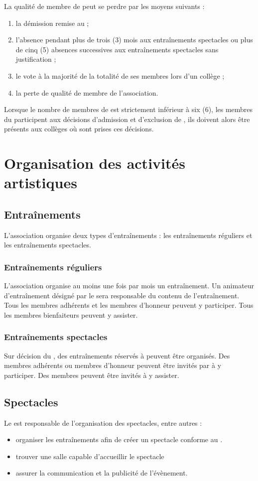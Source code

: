 \documentclass[a4paper,french,10pt]{article}
\newcommand{\article}[1]{\subsection{#1}\addtocounter{article}{1}}
\newcounter{article}
\begin{document}
La qualité de membre de \troupe{} peut se perdre par les moyens suivants :

\begin{enumerate}
	\item la démission remise au \DA{} ;
	\item l'absence pendant plus de trois  (3) mois aux entraînements spectacles ou plus de cinq (5) absences successives aux entraînements spectacles sans justification ;
	\item le vote à la majorité de la totalité de ses membres lors d'un collège ;
	\item la perte de qualité de membre de l'association.

\end{enumerate}

Lorsque le nombre de membres de \troupe{} est strictement inférieur à six (6), les membres du \bureau{} participent aux décisions d'admission et d'exclusion de \troupe{}, ils doivent alors être présents aux collèges où sont prises ces décisions.

\section{Organisation des activités artistiques}
\article{Entraînements}
\label{sec:entrainements}
L'association organise deux types d'entraînements : les entraînements réguliers et les entraînements spectacles.

\subsubsection*{Entraînements réguliers}
L'association organise au moins une fois par mois un entraînement. Un animateur d'entraînement désigné par le \DA{} sera responsable du contenu de l'entraînement. Tous les membres adhérents et les membres d'honneur peuvent y participer. Tous les membres bienfaiteurs peuvent y assister. 

\subsubsection*{Entraînements spectacles}
Sur décision du \DA{}, des entraînements réservés à \troupe{} peuvent être organisés. Des membres adhérents ou membres d'honneur peuvent être invités par \troupe{} à y participer. Des membres peuvent être invités à y assister.

\article{Spectacles}
\label{sec:spectacles}
Le \DA{} est responsable de l'organisation des spectacles, entre autres :
\begin{itemize}
\item organiser les entraînements afin de créer un spectacle conforme au \PA{}.
\item trouver une salle capable d'accueillir le spectacle
\item assurer la communication et la publicité de l'évènement.
\end{itemize}
\end{document}
